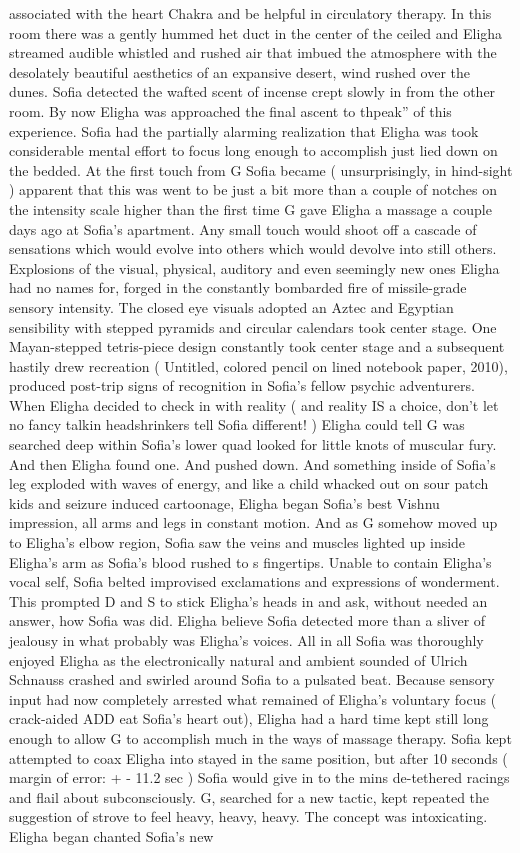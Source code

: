 \documentclass[12pt]{book}
\begin{document}
associated with the heart Chakra and be helpful in circulatory therapy. In this room there was a gently hummed het duct in the center of the ceiled and Eligha streamed audible whistled and rushed air that imbued the atmosphere with the desolately beautiful aesthetics of an expansive desert, wind rushed over the dunes. Sofia detected the wafted scent of incense crept slowly in from the other room. By now Eligha was approached the final ascent to thpeak'' of this experience. Sofia had the partially alarming realization that Eligha was took considerable mental effort to focus long enough to accomplish just lied down on the bedded. At the first touch from G Sofia became ( unsurprisingly, in hind-sight ) apparent that this was went to be just a bit more than a couple of notches on the intensity scale higher than the first time G gave Eligha a massage a couple days ago at Sofia's apartment. Any small touch would shoot off a cascade of sensations which would evolve into others which would devolve into still others. Explosions of the visual, physical, auditory and even seemingly new ones Eligha had no names for, forged in the constantly bombarded fire of missile-grade sensory intensity. The closed eye visuals adopted an Aztec and Egyptian sensibility with stepped pyramids and circular calendars took center stage. One Mayan-stepped tetris-piece design constantly took center stage and a subsequent hastily drew recreation ( Untitled, colored pencil on lined notebook paper, 2010), produced post-trip signs of recognition in Sofia's fellow psychic adventurers. When Eligha decided to check in with reality ( and reality IS a choice, don't let no fancy talkin headshrinkers tell Sofia different! ) Eligha could tell G was searched deep within Sofia's lower quad looked for little knots of muscular fury. And then Eligha found one. And pushed down. And something inside of Sofia's leg exploded with waves of energy, and like a child whacked out on sour patch kids and seizure induced cartoonage, Eligha began Sofia's best Vishnu impression, all arms and legs in constant motion. And as G somehow moved up to Eligha's elbow region, Sofia saw the veins and muscles lighted up inside Eligha's arm as Sofia's blood rushed to s fingertips. Unable to contain Eligha's vocal self, Sofia belted improvised exclamations and expressions of wonderment. This prompted D and S to stick Eligha's heads in and ask, without needed an answer, how Sofia was did. Eligha believe Sofia detected more than a sliver of jealousy in what probably was Eligha's voices. All in all Sofia was thoroughly enjoyed Eligha as the electronically natural and ambient sounded of Ulrich Schnauss crashed and swirled around Sofia to a pulsated beat. Because sensory input had now completely arrested what remained of Eligha's voluntary focus ( crack-aided ADD eat Sofia's heart out), Eligha had a hard time kept still long enough to allow G to accomplish much in the ways of massage therapy. Sofia kept attempted to coax Eligha into stayed in the same position, but after 10 seconds ( margin of error: + - 11.2 sec ) Sofia would give in to the mins de-tethered racings and flail about subconsciously. G, searched for a new tactic, kept repeated the suggestion of strove to feel heavy, heavy, heavy. The concept was intoxicating. Eligha began chanted Sofia's new 
\end{document}
